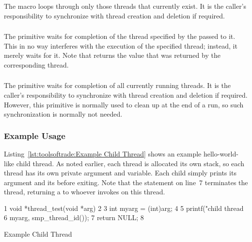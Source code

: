 \subsubsection{}

The 
macro loops through only those threads that currently exist.
It is the caller's responsibility to synchronize with thread
creation and deletion if required.

\subsubsection{}

The  primitive waits for completion of the thread
specified by the  passed to it.
This in no way interferes with the execution of the specified thread;
instead, it merely waits for it.
Note that  returns the value that was returned by
the corresponding thread.

\subsubsection{}

The 
primitive waits for completion of all currently running threads.
It is the caller's responsibility to synchronize with thread creation
and deletion if required.
However, this primitive is normally used to clean up at the end of
a run, so such synchronization is normally not needed.

\subsubsection{Example Usage}

Listing~\ref{lst:toolsoftrade:Example Child Thread}
shows an example hello-world-like child thread.
As noted earlier, each thread is allocated its own stack, so
each thread has its own private  argument and  variable.
Each child simply prints its argument and its 
before exiting.
Note that the  statement on line~7 terminates the thread,
returning a  to whoever invokes  on this
thread.

\begin{listing}[tbp]
{ \scriptsize
\begin{verbbox}
  1 void *thread_test(void *arg)
  2 {
  3   int myarg = (int)arg;
  4
  5   printf("child thread %
  6          myarg, smp_thread_id());
  7   return NULL;
  8 }
\end{verbbox}
}
\centering
\theverbbox
\caption{Example Child Thread}
\label{lst:toolsoftrade:Example Child Thread}
\end{listing}

